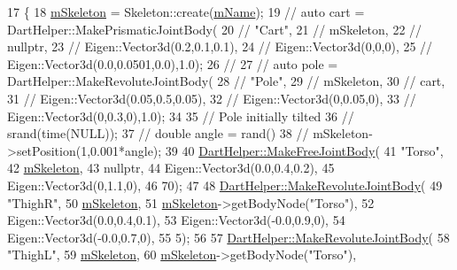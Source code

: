 \begin{DoxyCode}
17 \{
18     \hyperlink{class_v_p_c_1_1_character_afbd0d7d0c6227cabd47de1a5c2d7c039}{mSkeleton} = Skeleton::create(\hyperlink{class_v_p_c_1_1_character_a66b5e53cb1779993ae7b78e1b29209b5}{mName});
19 \textcolor{comment}{//  auto cart = DartHelper::MakePrismaticJointBody(}
20 \textcolor{comment}{//      "Cart",}
21 \textcolor{comment}{//      mSkeleton,}
22 \textcolor{comment}{//      nullptr,}
23 \textcolor{comment}{//      Eigen::Vector3d(0.2,0.1,0.1),}
24 \textcolor{comment}{//      Eigen::Vector3d(0,0,0),}
25 \textcolor{comment}{//      Eigen::Vector3d(0.0,0.0501,0.0),1.0);}
26 \textcolor{comment}{//}
27 \textcolor{comment}{//  auto pole = DartHelper::MakeRevoluteJointBody(}
28 \textcolor{comment}{//      "Pole",}
29 \textcolor{comment}{//      mSkeleton,}
30 \textcolor{comment}{//      cart,}
31 \textcolor{comment}{//      Eigen::Vector3d(0.05,0.5,0.05),}
32 \textcolor{comment}{//      Eigen::Vector3d(0,0.05,0),}
33 \textcolor{comment}{//      Eigen::Vector3d(0,0.3,0),1.0);}
34 
35 \textcolor{comment}{//   Pole initially tilted}
36 \textcolor{comment}{//    srand(time(NULL));}
37 \textcolor{comment}{//    double angle = rand()%
38 \textcolor{comment}{//  mSkeleton->setPosition(1,0.001*angle);}
39 
40     \hyperlink{namespace_v_p_c_1_1_dart_helper_a69fa7c63ad96f84bb86411e438a73d48}{DartHelper::MakeFreeJointBody}(
41         \textcolor{stringliteral}{"Torso"},
42         \hyperlink{class_v_p_c_1_1_character_afbd0d7d0c6227cabd47de1a5c2d7c039}{mSkeleton},
43         \textcolor{keyword}{nullptr},
44         Eigen::Vector3d(0.0,0.4,0.2),
45         Eigen::Vector3d(0,1.1,0),
46         70);
47 
48     \hyperlink{namespace_v_p_c_1_1_dart_helper_a4cf2225ca4d44189f0f0f390cf7aff99}{DartHelper::MakeRevoluteJointBody}(
49         \textcolor{stringliteral}{"ThighR"},
50         \hyperlink{class_v_p_c_1_1_character_afbd0d7d0c6227cabd47de1a5c2d7c039}{mSkeleton},
51         \hyperlink{class_v_p_c_1_1_character_afbd0d7d0c6227cabd47de1a5c2d7c039}{mSkeleton}->getBodyNode(\textcolor{stringliteral}{"Torso"}),
52         Eigen::Vector3d(0.0,0.4,0.1),
53         Eigen::Vector3d(-0.0,0.9,0),
54         Eigen::Vector3d(-0.0,0.7,0),
55         5);
56 
57     \hyperlink{namespace_v_p_c_1_1_dart_helper_a4cf2225ca4d44189f0f0f390cf7aff99}{DartHelper::MakeRevoluteJointBody}(
58         \textcolor{stringliteral}{"ThighL"},
59         \hyperlink{class_v_p_c_1_1_character_afbd0d7d0c6227cabd47de1a5c2d7c039}{mSkeleton},
60         \hyperlink{class_v_p_c_1_1_character_afbd0d7d0c6227cabd47de1a5c2d7c039}{mSkeleton}->getBodyNode(\textcolor{stringliteral}{"Torso"}),
}
\end{DoxyCode}
